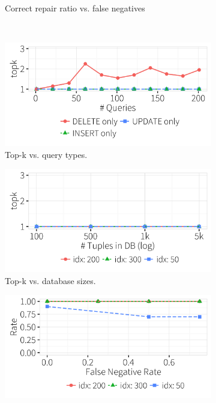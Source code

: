 \begin{figure}[t]
\begin{subfigure} [t]{.3\textwidth}
    \vspace*{-.25in}
    \caption{Correct repair ratio vs. false negatives}
    \label{f:fnratio} 
    \end{subfigure} \\
    \begin{subfigure} [t]{.3\textwidth}
    \includegraphics[width = .99\columnwidth]{figures/indelup_fixcount}
    \vspace*{-.25in}
    \caption{Top-k vs. query types. }
    \vspace*{-.1in}
    \label{f:querytypefixcount} 
    \end{subfigure}
    \begin{subfigure} [t]{.3\textwidth}
    \includegraphics[width = .99\columnwidth]{figures/dbsize_fixcount}
    \vspace*{-.25in}
    \caption{Top-k vs. database sizes. }
    \vspace*{-.1in}
    \label{f:dbsizecount} 
    \end{subfigure}
    \begin{subfigure} [t]{.3\textwidth}
    \includegraphics[width = .99\columnwidth]{figures/noise_fn_acc_idx}

\end{subfigure}
\end{figure}
